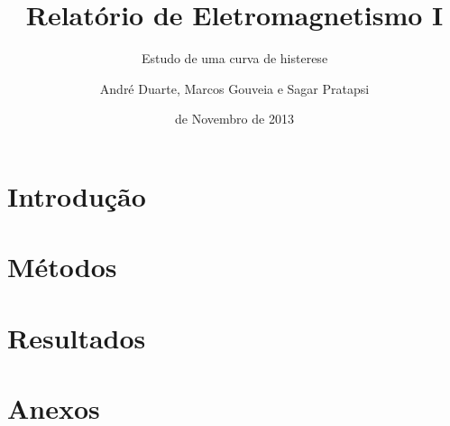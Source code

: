 \documentclass[10pt,notitlepage,a4paper]{article}
\title{Relatório de Eletromagnetismo I}
\subtitle{Estudo de uma curva de histerese}
\author{André Duarte, Marcos Gouveia e Sagar Pratapsi}
\date{ de Novembro de 2013}
\begin{document}
\maketitle

\section{Introdução}

\section{Métodos}

\section{Resultados}

\section{Anexos}
\end{document}
